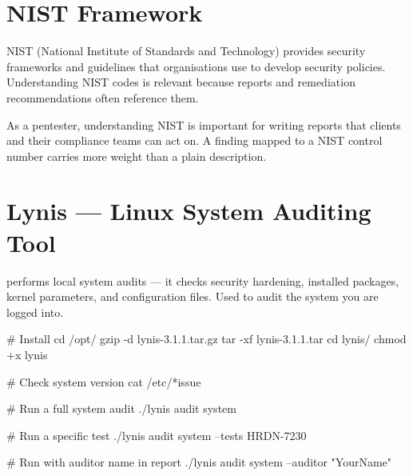 \section{NIST Framework}
\label{sec:nist}

NIST (National Institute of Standards and Technology) provides security
frameworks and guidelines that organisations use to develop security policies.
Understanding NIST codes is relevant because reports and remediation recommendations
often reference them.

\begin{notebox}
As a pentester, understanding NIST is important for writing reports that clients
and their compliance teams can act on. A finding mapped to a NIST control number
carries more weight than a plain description.
\end{notebox}

\section{Lynis --- Linux System Auditing Tool}
\label{sec:lynis}

 performs local system audits --- it checks security hardening, installed
packages, kernel parameters, and configuration files. Used to audit the system
you are logged into.



\begin{termbox}
# Install
cd /opt/
gzip -d lynis-3.1.1.tar.gz
tar -xf lynis-3.1.1.tar
cd lynis/
chmod +x lynis

# Check system version
cat /etc/*issue

# Run a full system audit
./lynis audit system

# Run a specific test
./lynis audit system --tests HRDN-7230

# Run with auditor name in report
./lynis audit system --auditor "YourName"
\end{termbox}

